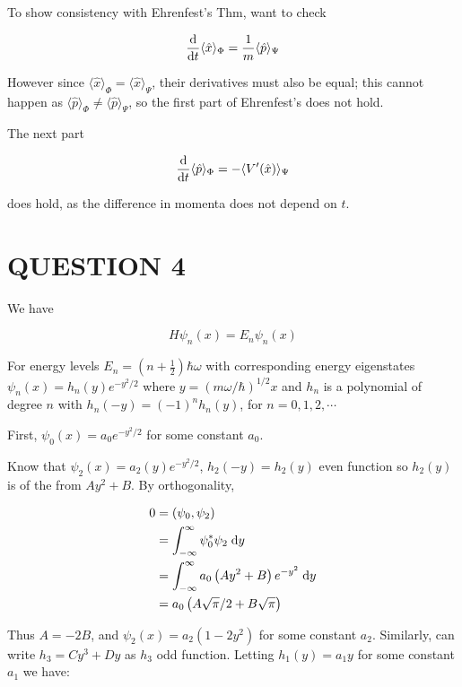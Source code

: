 \documentclass[a4paper]{article}
\begin{document}
To show consistency with Ehrenfest's Thm, want to check

\[ \frac{\mathrm{d} }{\mathrm{d} t} \langle \hat{x} \rangle_{\Phi}  = \frac{1}{m} \langle \hat{p}  \rangle_{\Psi}  \]

However since $ \langle \hat{x} \rangle_{\Phi} = \langle \hat{x} \rangle_{\Psi} $, their derivatives must also be equal; this cannot happen as $ \langle \hat{p} \rangle_{\Phi} \neq \langle \hat{p} \rangle_{\Psi} $, so the first part of Ehrenfest's does not hold. 

The next part 

\[ \frac{\mathrm{d} }{\mathrm{d} t} \langle \hat{p} \rangle_{\Phi}  = - \langle V'(\hat{x})  \rangle_{\Psi}  \]

does hold, as the difference in momenta does not depend on $ t $.

\section{QUESTION 4}

We have

\[ H \psi_{n}(x) = E_{n} \psi_{n}(x)  \]

For energy levels $ E_{n} = (n + \frac{1}{2}) \hbar \omega $ with corresponding energy eigenstates $ \psi_{n}(x) = h_{n}(y) e^{-y^{2}/2} $ where $ y = (m \omega / \hbar )^{1/2} x $ and $ h_{n} $ is a polynomial of degree $ n $ with $ h_{n}(-y) = (-1)^{n} h_{n}(y) $, for $ n = 0,1,2,\cdots $

First, $ \psi_{0}(x) = a_{0} e^{- y^{2} / 2} $ for some constant $ a_{0} $.

Know that $ \psi_{2}(x) = a_{2}(y) e^{-y^{2}/2}  $, $ h_{2}(-y) = h_{2}(y) $ even function so $ h_{2}(y) $ is of the from $ Ay^{2} + B $. By orthogonality,

\begin{align*}
0 & = (\psi_{0},\psi_{2}) \\
& = \int_{- \infty}^{\infty} \psi_{0}^{*} \psi_{2} \; \mathrm{d} y  \\
& = \int_{- \infty}^{\infty} a_{0} \left( Ay^{2} + B \right)e^{- y^{2}}    \; \mathrm{d} y \\
& = a_{0} \left( A \sqrt{\pi}/2 + B \sqrt{\pi}  \right) 
\end{align*}

Thus $ A = - 2B $, and $ \psi_{2}(x) = a_2(1 - 2y^{2}) $ for some constant $ a_{2} $. Similarly, can write $ h_{3} = C y^{3} + D y $ as $ h_{3} $ odd function. Letting $ h_{1}(y) = a_{1} y $ for some constant $ a_{1} $ we have:
\end{document}
